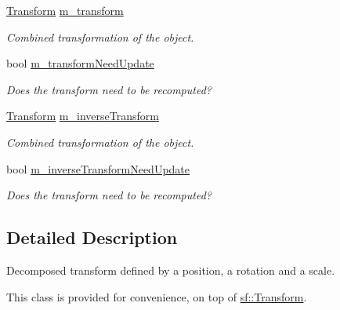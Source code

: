 \begin{DoxyCompactItemize}
\mbox{\hyperlink{classsf_1_1_transform}{Transform}} \mbox{\hyperlink{classsf_1_1_transformable_ae7451ed9c4d1065fc050ce3e5ad7b34c}{m\+\_\+transform}}
\begin{DoxyCompactList}\small\item\em Combined transformation of the object. \end{DoxyCompactList}\item 
\mbox{\label{classsf_1_1_transformable_a394b22bfe9e9e44c672244e4da0b3c58}} 
bool \mbox{\hyperlink{classsf_1_1_transformable_a394b22bfe9e9e44c672244e4da0b3c58}{m\+\_\+transform\+Need\+Update}}
\begin{DoxyCompactList}\small\item\em Does the transform need to be recomputed? \end{DoxyCompactList}\item 
\mbox{\label{classsf_1_1_transformable_a6538c7efb49ad3a430d45c8a52368f36}} 
\mbox{\hyperlink{classsf_1_1_transform}{Transform}} \mbox{\hyperlink{classsf_1_1_transformable_a6538c7efb49ad3a430d45c8a52368f36}{m\+\_\+inverse\+Transform}}
\begin{DoxyCompactList}\small\item\em Combined transformation of the object. \end{DoxyCompactList}\item 
\mbox{\label{classsf_1_1_transformable_afbb99d25b4ea10943e883d45a7594761}} 
bool \mbox{\hyperlink{classsf_1_1_transformable_afbb99d25b4ea10943e883d45a7594761}{m\+\_\+inverse\+Transform\+Need\+Update}}
\begin{DoxyCompactList}\small\item\em Does the transform need to be recomputed? \end{DoxyCompactList}\end{DoxyCompactItemize}


\subsection{Detailed Description}
Decomposed transform defined by a position, a rotation and a scale. 

\begin{DoxyVerb}\end{DoxyVerb}


This class is provided for convenience, on top of \mbox{\hyperlink{classsf_1_1_transform}{sf\+::\+Transform}}.


